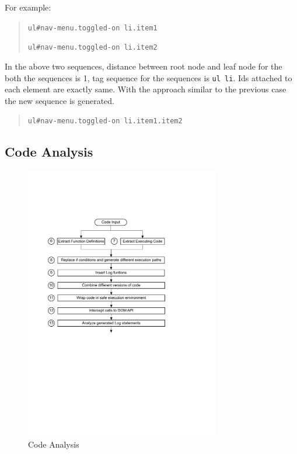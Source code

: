 \begin{description}
			For example:
			\begin{quote}
				\texttt{ul\#nav-menu.toggled-on li.item1}
	
				\texttt{ul\#nav-menu.toggled-on li.item2}
			\end{quote}

			In the above two sequences, distance between root node and leaf node for the both the sequences is 1, tag sequence for the sequences is \texttt{ul li}. Ids attached to each element are exactly same. With the approach similar to the previous case the new sequence is generated.

			\begin{quote}
				\texttt{ul\#nav-menu.toggled-on li.item1.item2}
			\end{quote}
		
		\end{description}
	
	\subsection{Code Analysis}
	\label{Sec:Code-Analysis}
		\begin{figure}
			\centering
			\includegraphics[width=85mm]{images/code_analysis.pdf}
			\caption{Code Analysis}
			\label{Fig:Code-Analysis}
		\end{figure}
		
